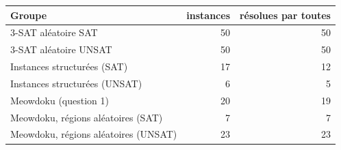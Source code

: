 \begin{tabular}{lrr}
\toprule
Groupe & instances & résolues par toutes \\
\midrule
3-SAT aléatoire SAT & 50 & 50 \\
3-SAT aléatoire UNSAT & 50 & 50 \\
Instances structurées (SAT) & 17 & 12 \\
Instances structurées (UNSAT) & 6 & 5 \\
Meowdoku (question 1) & 20 & 19 \\
Meowdoku, régions aléatoires (SAT) & 7 & 7 \\
Meowdoku, régions aléatoires (UNSAT) & 23 & 23 \\
\bottomrule
\end{tabular}
